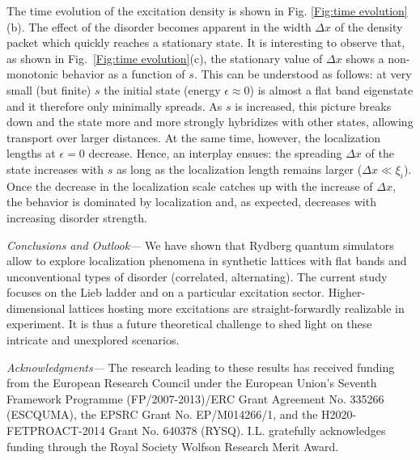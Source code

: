 \documentclass[prl,aps,twocolumn,showpacs,superscriptaddress,longbibliography]{revtex4-1}
\begin{document}
The time evolution of the excitation density is shown in Fig. \ref{Fig:time evolution}(b). The effect of the disorder becomes apparent in the width $\Delta x$ \cite{SM} of the density packet which quickly reaches a stationary state. It is interesting to observe that, as shown in Fig.~\ref{Fig:time evolution}(c), the stationary value of $\Delta x$ shows a non-monotonic behavior as a function of $s$. This can be understood as follows: at very small (but finite) $s$ the initial state (energy $\epsilon \approx 0$) is almost a flat band eigenstate and it therefore only minimally spreads. As $s$ is increased, this picture breaks down and the state more and more strongly hybridizes with other states, allowing transport over larger distances. At the same time, however, the localization lengths at $\epsilon = 0$ decrease. Hence, an interplay ensues: the spreading $\Delta x$ of the state increases with $s$ as long as the localization length remains larger ($\Delta x \ll \xi_i$). Once the decrease in the localization scale catches up with the increase of $\Delta x$, the behavior is dominated by localization and, as expected, decreases with increasing disorder strength.

\emph{Conclusions and Outlook---} We have shown that Rydberg quantum simulators allow to explore localization phenomena in synthetic lattices with flat bands and unconventional types of disorder (correlated, alternating). The current study focuses on the Lieb ladder and on a particular excitation sector. Higher-dimensional lattices hosting more excitations are straight-forwardly realizable in experiment. It is thus a future theoretical challenge to shed light on these intricate and unexplored scenarios.

\emph{Acknowledgments---} The research  leading  to  these  results  has  received  funding  from the European Research Council under the European Union’s Seventh Framework Programme (FP/2007-2013)/ERC Grant Agreement No.
335266 (ESCQUMA), the EPSRC Grant No. EP/M014266/1, and the H2020-FETPROACT-2014 Grant No. 640378 (RYSQ). I.L. gratefully acknowledges funding through the Royal Society Wolfson Research Merit Award.




\end{document}
